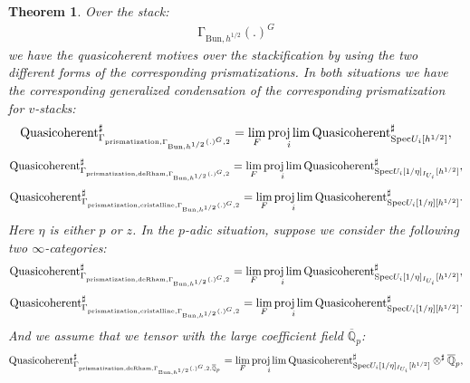 \documentclass[12pt]{article}
\newtheorem{theorem}{Theorem}
\theoremstyle{definition}
\begin{document}
\begin{theorem}
Over the stack:
\begin{align}
\mathrm{\Gamma}_{\mathrm{Bun},h^{1/2}}(.)^G
\end{align}
we have the quasicoherent motives over the stackification by using the two different forms of the corresponding prismatizations. In both situations we have the corresponding generalized condensation of the corresponding prismatization for $v$-stacks:
\begin{align}
\mathrm{Quasicoherent}^\sharp_{\mathrm{\Gamma}_{\mathrm{prismatization},\mathrm{\Gamma}_{\mathrm{Bun},h^{1/2}}(.)^G,2}}=\lim_{F}\projlim_i \mathrm{Quasicoherent}^\sharp_{\mathrm{Spec}U_i[h^{1/2}]},
\end{align}
\begin{align}
\mathrm{Quasicoherent}^\sharp_{\mathrm{\Gamma}_{\mathrm{prismatization},\mathrm{deRham},\mathrm{\Gamma}_{\mathrm{Bun},h^{1/2}}(.)^G,2}}=\lim_{F}\projlim_i \mathrm{Quasicoherent}^\sharp_{\mathrm{Spec}U_i[1/\eta]_{I_{U_i}}[h^{1/2}]},
\end{align}
\begin{align}
\mathrm{Quasicoherent}^\sharp_{\mathrm{\Gamma}_{\mathrm{prismatization},\mathrm{cristalline},\mathrm{\Gamma}_{\mathrm{Bun},h^{1/2}}(.)^G,2}}=\lim_{F}\projlim_i \mathrm{Quasicoherent}^\sharp_{\mathrm{Spec}U_i[1/\eta][h^{1/2}]}.
\end{align}
Here $\eta$ is either $p$ or $z$. In the $p$-adic situation, suppose we consider the following two $\infty$-categories:
\begin{align}
\mathrm{Quasicoherent}^\sharp_{\mathrm{\Gamma}_{\mathrm{prismatization},\mathrm{deRham},\mathrm{\Gamma}_{\mathrm{Bun},h^{1/2}}(.)^G,2}}=\lim_{F}\projlim_i \mathrm{Quasicoherent}^\sharp_{\mathrm{Spec}U_i[1/\eta]_{I_{U_i}}[h^{1/2}]},
\end{align}
\begin{align}
\mathrm{Quasicoherent}^\sharp_{\mathrm{\Gamma}_{\mathrm{prismatization},\mathrm{cristalline},\mathrm{\Gamma}_{\mathrm{Bun},h^{1/2}}(.)^G,2}}=\lim_{F}\projlim_i \mathrm{Quasicoherent}^\sharp_{\mathrm{Spec}U_i[1/\eta][h^{1/2}]}.
\end{align}
And we assume that we tensor with the large coefficient field $\overline{\mathbb{Q}}_p$:
\begin{align}
\mathrm{Quasicoherent}^\sharp_{\mathrm{\Gamma}_{\mathrm{prismatization},\mathrm{deRham},\mathrm{\Gamma}_{\mathrm{Bun},h^{1/2}}(.)^G,2,\overline{\mathbb{Q}}_p}}=\lim_{F}\projlim_i \mathrm{Quasicoherent}^\sharp_{\mathrm{Spec}U_i[1/\eta]_{I_{U_i}}[h^{1/2}]}\otimes^\sharp \overline{\mathbb{Q}}_p,

\end{align}
\end{theorem}
\end{document}
